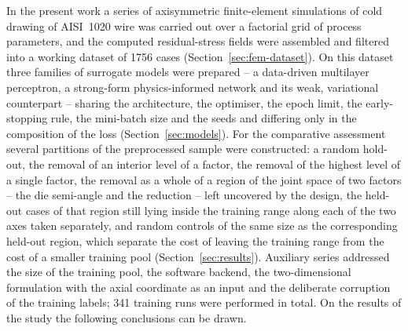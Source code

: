 \documentclass[subscriptcorrection,upint,varvw,barcolor=Goldenrod3,mathalfa=cal=euler,balance,hyphenate,french,pdf-a]{asmejour} %
\begin{document}
In the present work a series of axisymmetric finite-element simulations of cold drawing of AISI~1020 wire was carried out over a factorial grid of process parameters, and the computed residual-stress fields were assembled and filtered into a working dataset of 1756 cases (Section~\ref{sec:fem-dataset}). On this dataset three families of surrogate models were prepared -- a data-driven multilayer perceptron, a strong-form physics-informed network and its weak, variational counterpart -- sharing the architecture, the optimiser, the epoch limit, the early-stopping rule, the mini-batch size and the seeds and differing only in the composition of the loss (Section~\ref{sec:models}). For the comparative assessment several partitions of the preprocessed sample were constructed: a random hold-out, the removal of an interior level of a factor, the removal of the highest level of a single factor, the removal as a whole of a region of the joint space of two factors -- the die semi-angle and the reduction -- left uncovered by the design, the held-out cases of that region still lying inside the training range along each of the two axes taken separately, and random controls of the same size as the corresponding held-out region, which separate the cost of leaving the training range from the cost of a smaller training pool (Section~\ref{sec:results}). Auxiliary series addressed the size of the training pool, the software backend, the two-dimensional formulation with the axial coordinate as an input and the deliberate corruption of the training labels; 341 training runs were performed in total. On the results of the study the following conclusions can be drawn.
\end{document}
